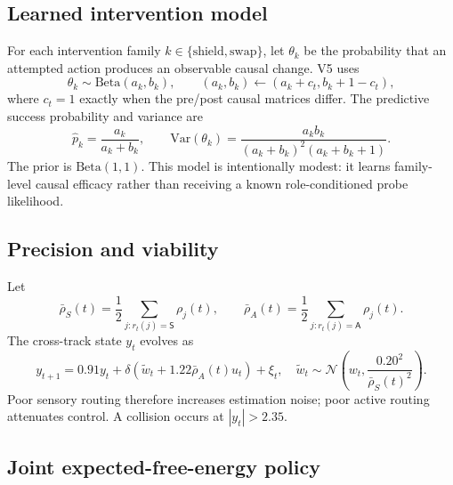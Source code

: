 \documentclass[11pt,a4paper]{article}
\numberwithin{equation}{section}
\newcommand{\Srole}{\mathsf{S}}
\newcommand{\Arole}{\mathsf{A}}
\begin{document}
\subsection{Learned intervention model}

For each intervention family $k\in\{\mathrm{shield},\mathrm{swap}\}$, let
$\theta_k$ be the probability that an attempted action produces an observable
causal change. V5 uses
\begin{equation}
 \theta_k\sim\mathrm{Beta}(a_k,b_k),\qquad
 (a_k,b_k)\leftarrow(a_k+c_t,b_k+1-c_t),
 \label{eq:beta-intervention}
\end{equation}
where $c_t=1$ exactly when the pre/post causal matrices differ. The predictive
success probability and variance are
\begin{equation}
 \widehat p_k=\frac{a_k}{a_k+b_k},\qquad
 \mathrm{Var}(\theta_k)=\frac{a_kb_k}{(a_k+b_k)^2(a_k+b_k+1)}.
 \label{eq:beta-moments}
\end{equation}
The prior is $\mathrm{Beta}(1,1)$. This model is intentionally modest: it
learns family-level causal efficacy rather than receiving a known
role-conditioned probe likelihood.

\subsection{Precision and viability}

Let
\begin{equation}
 \bar\rho_S(t)=\frac{1}{2}\sum_{j:r_t(j)=\Srole}\rho_j(t),\qquad
 \bar\rho_A(t)=\frac{1}{2}\sum_{j:r_t(j)=\Arole}\rho_j(t).
 \label{eq:precision}
\end{equation}
The cross-track state $y_t$ evolves as
\begin{equation}
 y_{t+1}=0.91y_t+\delta\left(\widetilde w_t
 +1.22\bar\rho_A(t)u_t\right)+\xi_t,
 \quad
 \widetilde w_t\sim\mathcal N\!\left(w_t,
 \frac{0.20^2}{\bar\rho_S(t)^2}\right).
 \label{eq:viability-dynamics}
\end{equation}
Poor sensory routing therefore increases estimation noise; poor active routing
attenuates control. A collision occurs at $|y_t|>2.35$.

\subsection{Joint expected-free-energy policy}
\end{document}
